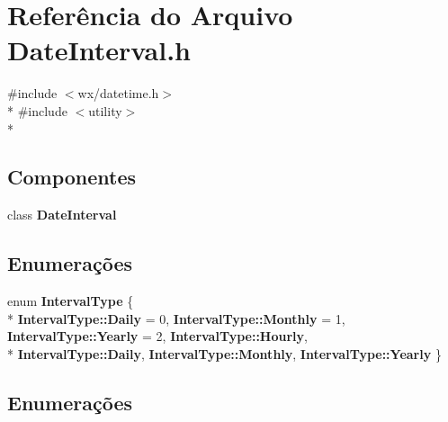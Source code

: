 \section{Referência do Arquivo Date\+Interval.\+h}
\label{_date_interval_8h}
{\ttfamily \#include $<$wx/datetime.\+h$>$}\\*
{\ttfamily \#include $<$utility$>$}\\*
\subsection*{Componentes}
\begin{DoxyCompactItemize}
\item 
class {\bf Date\+Interval}
\end{DoxyCompactItemize}
\subsection*{Enumerações}
\begin{DoxyCompactItemize}
\item 
enum {\bf Interval\+Type} \{ \\*
{\bf Interval\+Type\+::\+Daily} = 0, 
{\bf Interval\+Type\+::\+Monthly} = 1, 
{\bf Interval\+Type\+::\+Yearly} = 2, 
{\bf Interval\+Type\+::\+Hourly}, 
\\*
{\bf Interval\+Type\+::\+Daily}, 
{\bf Interval\+Type\+::\+Monthly}, 
{\bf Interval\+Type\+::\+Yearly}
 \}
\end{DoxyCompactItemize}


\subsection{Enumerações}
